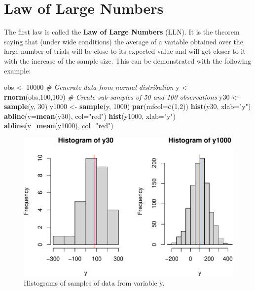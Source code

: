 \documentclass[
]{book}
\newenvironment{Shaded}{\begin{snugshade}}{\end{snugshade}}
\newcommand{\CommentTok}[1]{\textcolor[rgb]{0.56,0.35,0.01}{\textit{#1}}}
\newcommand{\DataTypeTok}[1]{\textcolor[rgb]{0.13,0.29,0.53}{#1}}
\newcommand{\DecValTok}[1]{\textcolor[rgb]{0.00,0.00,0.81}{#1}}
\newcommand{\KeywordTok}[1]{\textcolor[rgb]{0.13,0.29,0.53}{\textbf{#1}}}
\newcommand{\NormalTok}[1]{#1}
\newcommand{\StringTok}[1]{\textcolor[rgb]{0.31,0.60,0.02}{#1}}
\theoremstyle{definition}
\theoremstyle{definition}
\theoremstyle{definition}
\theoremstyle{definition}
\theoremstyle{remark}
\begin{document}
\hypertarget{LLN}{%
\section{Law of Large Numbers}\label{LLN}}

The first law is called the \textbf{Law of Large Numbers} (LLN). It is the theorem saying that (under wide conditions) the average of a variable obtained over the large number of trials will be close to its expected value and will get closer to it with the increase of the sample size. This can be demonstrated with the following example:

\begin{Shaded}
\begin{Highlighting}[]
\NormalTok{obs \textless{}{-}}\StringTok{ }\DecValTok{10000}
\CommentTok{\# Generate data from normal distribution}
\NormalTok{y \textless{}{-}}\StringTok{ }\KeywordTok{rnorm}\NormalTok{(obs,}\DecValTok{100}\NormalTok{,}\DecValTok{100}\NormalTok{)}
\CommentTok{\# Create sub{-}samples of 50 and 100 observations}
\NormalTok{y30 \textless{}{-}}\StringTok{ }\KeywordTok{sample}\NormalTok{(y, }\DecValTok{30}\NormalTok{)}
\NormalTok{y1000 \textless{}{-}}\StringTok{ }\KeywordTok{sample}\NormalTok{(y, }\DecValTok{1000}\NormalTok{)}
\KeywordTok{par}\NormalTok{(}\DataTypeTok{mfcol=}\KeywordTok{c}\NormalTok{(}\DecValTok{1}\NormalTok{,}\DecValTok{2}\NormalTok{))}
\KeywordTok{hist}\NormalTok{(y30, }\DataTypeTok{xlab=}\StringTok{"y"}\NormalTok{)}
\KeywordTok{abline}\NormalTok{(}\DataTypeTok{v=}\KeywordTok{mean}\NormalTok{(y30), }\DataTypeTok{col=}\StringTok{"red"}\NormalTok{)}
\KeywordTok{hist}\NormalTok{(y1000, }\DataTypeTok{xlab=}\StringTok{"y"}\NormalTok{)}
\KeywordTok{abline}\NormalTok{(}\DataTypeTok{v=}\KeywordTok{mean}\NormalTok{(y1000), }\DataTypeTok{col=}\StringTok{"red"}\NormalTok{)}
\end{Highlighting}
\end{Shaded}

\begin{figure}
\centering
\includegraphics{Svetunkov---Statistics-for-Business-Analytics_files/figure-latex/histY30Y1000-1.pdf}
\caption{\label{fig:histY30Y1000}Histograms of samples of data from variable y.}
\end{figure}
\end{document}
